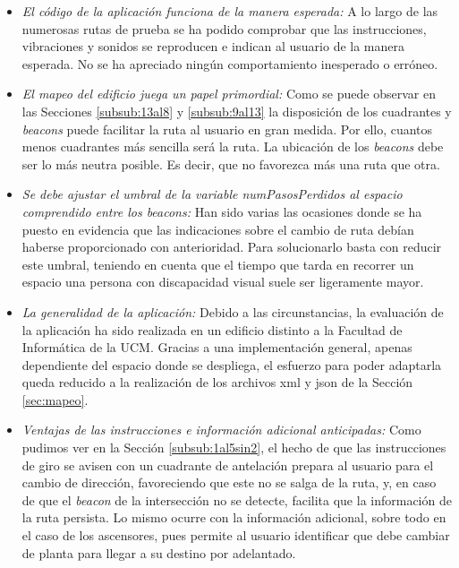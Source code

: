 \begin{itemize}
	\item \textit{El código de la aplicación funciona de la manera esperada:} A lo largo de las numerosas rutas de prueba se ha podido comprobar que las instrucciones, vibraciones y sonidos se reproducen e indican al usuario de la manera esperada. No se ha apreciado ningún comportamiento inesperado o erróneo. 
	
	\item \textit{El mapeo del edificio juega un papel primordial:} Como se puede observar en las Secciones \ref{subsub:13al8} y \ref{subsub:9al13} la disposición de los cuadrantes y \textit{beacons} puede facilitar la ruta al usuario en gran medida. Por ello, cuantos menos cuadrantes más sencilla será la ruta. La ubicación de los \textit{beacons} debe ser lo más neutra posible. Es decir, que no favorezca más una ruta que otra.
	
	\item  \textit{Se debe ajustar el umbral de la variable numPasosPerdidos al espacio comprendido entre los beacons:} Han sido varias las ocasiones donde se ha puesto en evidencia que las indicaciones sobre el cambio de ruta debían haberse proporcionado con anterioridad. Para solucionarlo basta con reducir este umbral, teniendo en cuenta que el tiempo que tarda en recorrer un espacio una persona con discapacidad visual suele ser ligeramente mayor.
	
	\item \textit{La generalidad de la aplicación:} Debido a las circunstancias, la evaluación de la aplicación ha sido realizada en un edificio distinto a la Facultad de Informática de la UCM. Gracias a una implementación general, apenas dependiente del espacio donde se despliega, el esfuerzo para poder adaptarla queda reducido a la realización de los archivos xml y json de la Sección \ref{sec:mapeo}.
	
	\item \textit{Ventajas de las instrucciones e información adicional anticipadas:} Como pudimos ver en la Sección \ref{subsub:1al5sin2}, el hecho de que las instrucciones de giro se avisen con un cuadrante de antelación prepara al usuario para el cambio de dirección, favoreciendo que este no se salga de la ruta, y, en caso de que el \textit{beacon} de la intersección no se detecte, facilita que la información de la ruta persista. Lo mismo ocurre con la información adicional, sobre todo en el caso de los ascensores, pues permite al usuario identificar que debe cambiar de planta para llegar a su destino por adelantado.

\end{itemize}


